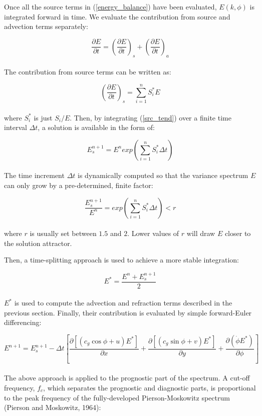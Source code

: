 \documentclass[letterpaper]{article}
\numberwithin{equation}{section}
\begin{document}
Once all the source terms in (\ref{energy_balance}) have been evaluated,
$E(k,\phi)$ is integrated forward in time.
We evaluate the contribution from source and advection terms separately:

\begin{equation}
\dfrac{\partial E}{\partial t}=\left(\dfrac{\partial E}{\partial t}\right)_{s}
                              +\left(\dfrac{\partial E}{\partial t}\right)_{a}
\end{equation}
\\
The contribution from source terms can be written as:

\begin{equation}
\left(\dfrac{\partial E}{\partial t}\right)_{s}=\displaystyle\sum_{i=1}^{n}S_{i}^{*}E
\label{src_tend}
\end{equation}
\\
where $S_{i}^{*}$ is just $S_{i}/E$.
Then, by integrating (\ref{src_tend}) over a finite time interval $\Delta t$,
a solution is available in the form of:

\begin{equation}
E^{n+1}_{s}=E^{n}exp\left(\displaystyle\sum_{i=1}^{n}S_{i}^{*}\Delta t\right)
\end{equation}
\\

The time increment $\Delta t$ is dynamically computed so that the variance spectrum $E$
can only grow by a pre-determined, finite factor:

\begin{equation}
\dfrac{E^{n+1}_{s}}{E^{n}}=exp\left(\displaystyle\sum_{i=1}^{n}S_{i}^{*}\Delta t\right)<r
\end{equation}
\\
where $r$ is usually set between $1.5$ and $2$.
Lower values of $r$ will draw $E$ closer to the solution attractor.

Then, a time-splitting approach is used to achieve a more stable integration:

\begin{equation}
E^{*}=\dfrac{E^{n}+E^{n+1}_{s}}{2}
\end{equation}
\\
$E^{*}$ is used to compute the advection and refraction terms described in the previous section.
Finally, their contribution is evaluated by simple forward-Euler differencing:

\begin{equation}
E^{n+1}=E^{n+1}_{s}-\Delta t\left[\dfrac{\partial [(c_{g}\cos{\phi}+u)E^{*}]}{\partial x} 
                                              +\dfrac{\partial [(c_{g}\sin{\phi}+v)E^{*}]}{\partial y}
                                              +\dfrac{\partial (\dot{\phi}E^{*})}{\partial \phi}\right]
\end{equation}
\\
The above approach is applied to the prognostic part of the spectrum.
A cut-off frequency, $f_{c}$, which separates the prognostic and diagnostic parts,
is proportional to the peak frequency of the fully-developed Pierson-Moskowitz spectrum (Pierson and Moskowitz, 1964):
\end{document}
